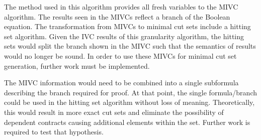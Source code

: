 The method used in this algorithm provides all fresh variables to the MIVC algorithm. The results seen in the MIVCs reflect a branch of the Boolean equation. The transformation from MIVCs to minimal cut sets include a hitting set algorithm. Given the IVC results of this granularity algorithm, the hitting sets would split the branch shown in the MIVC such that the semantics of results would no longer be sound. In order to use these MIVCs for minimal cut set generation, further work must be implemented. 

The MIVC information would need to be combined into a single subformula describing the branch required for proof. At that point, the single formula/branch could be used in the hitting set algorithm without loss of meaning. Theoretically, this would result in more exact cut sets and eliminate the possibility of dependent contracts causing additional elements within the set. Further work is required to test that hypothesis. 






